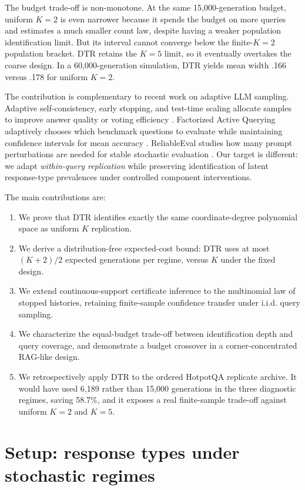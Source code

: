 \documentclass[11pt]{article}
\theoremstyle{remark}
\begin{document}
The budget trade-off is non-monotone. At the same 15,000-generation budget, uniform $K=2$ is even narrower because it spends the budget on more queries and estimates a much smaller count law, despite having a weaker population identification limit. But its interval cannot converge below the finite-$K=2$ population bracket. DTR retains the $K=5$ limit, so it eventually overtakes the coarse design. In a 60,000-generation simulation, DTR yields mean width .166 versus .178 for uniform $K=2$.

The contribution is complementary to recent work on adaptive LLM sampling. Adaptive self-consistency, early stopping, and test-time scaling allocate samples to improve answer quality or voting efficiency \citep{Kim2026ReASC,Na2026CASE,Wan2026BEACON,Nguyen2026UAB}. Factorized Active Querying adaptively chooses which benchmark questions to evaluate while maintaining confidence intervals for mean accuracy \citep{Wu2026FAQ}. ReliableEval studies how many prompt perturbations are needed for stable stochastic evaluation \citep{Lior2025ReliableEval}. Our target is different: we adapt \emph{within-query replication} while preserving identification of latent response-type prevalences under controlled component interventions.

The main contributions are:
\begin{enumerate}[leftmargin=*]
\item We prove that DTR identifies exactly the same coordinate-degree polynomial space as uniform $K$ replication.
\item We derive a distribution-free expected-cost bound: DTR uses at most $(K+2)/2$ expected generations per regime, versus $K$ under the fixed design.
\item We extend continuous-support certificate inference to the multinomial law of stopped histories, retaining finite-sample confidence transfer under i.i.d. query sampling.
\item We characterize the equal-budget trade-off between identification depth and query coverage, and demonstrate a budget crossover in a corner-concentrated RAG-like design.
\item We retrospectively apply DTR to the ordered HotpotQA replicate archive. It would have used 6,189 rather than 15,000 generations in the three diagnostic regimes, saving 58.7\%, and it exposes a real finite-sample trade-off against uniform $K=2$ and $K=5$.
\end{enumerate}

\section{Setup: response types under stochastic regimes}
\end{document}
